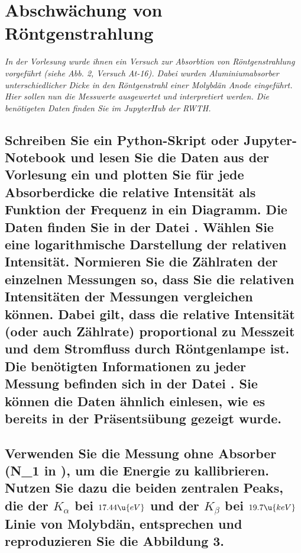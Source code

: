 \documentclass[ex, minted]{exercise_4.1}
\begin{document}
\section{Abschwächung von Röntgenstrahlung}
{\it In der Vorlesung wurde ihnen ein Versuch zur Absorbtion von Röntgenstrahlung vorgeführt (siehe Abb. 2, Versuch At-16). Dabei wurden Aluminiumabsorber unterschiedlicher Dicke in den Röntgenstrahl einer Molybdän Anode eingeführt. Hier sollen nun die Messwerte ausgewertet und interpretiert werden. Die benötigeten Daten finden Sie im JupyterHub der RWTH.}

\subsection{Schreiben Sie ein Python-Skript oder Jupyter-Notebook und lesen Sie die Daten aus der Vorlesung ein und plotten Sie für jede Absorberdicke die relative Intensität als Funktion der Frequenz in ein Diagramm. Die Daten finden Sie in der Datei . Wählen Sie eine logarithmische Darstellung der relativen Intensität. Normieren Sie die Zählraten der einzelnen Messungen so, dass Sie die relativen Intensitäten der Messungen vergleichen können. Dabei gilt, dass die relative Intensität (oder auch Zählrate) proportional zu Messzeit und dem Stromfluss durch Röntgenlampe ist. Die benötigten Informationen zu jeder Messung befinden sich in der Datei . Sie können die Daten ähnlich einlesen, wie es bereits in der Präsentsübung gezeigt wurde.}

\dottedlinett


\begin{figure}[H]
    \centering
    
\end{figure}

\subsection{Verwenden Sie die Messung ohne Absorber (N\_1 in ), um die Energie zu kallibrieren. Nutzen Sie dazu die beiden zentralen Peaks, die der \(K_\alpha\) bei \(17.44\u{eV}\) und der \(K_\beta\) bei \(19.7\u{keV}\) Linie von Molybdän, entsprechen und reproduzieren Sie die Abbildung 3.}

\dottedlinett

\end{document}
